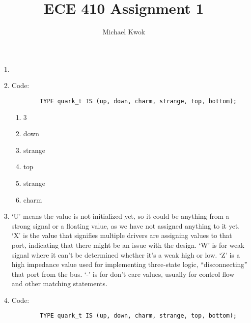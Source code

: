 \documentclass{article}
\title{ECE 410 Assignment 1}
\author{Michael Kwok}
\begin{document}
\maketitle
\begin{enumerate}
    \item

    \item
          Code:
          \begin{verbatim}
        TYPE quark_t IS (up, down, charm, strange, top, bottom);
      \end{verbatim}

          \begin{enumerate}
              \item 3
              \item down
              \item strange
              \item top
              \item strange
              \item charm
          \end{enumerate}

    \item `U' means the value is not initialized yet, so it could be anything from a strong signal or a floating value, as we have not assigned anything to it yet. `X' is the value that signifies multiple drivers are assigning values to that port, indicating that there might be an issue with the design. `W' is for weak signal where it can't be determined whether it's a weak high or low. `Z' is a high impedance value used for implementing three-state logic, ``disconnecting'' that port from the bus. `-' is for don't care values, usually for control flow and other matching statements.

    \item Code:
    \begin{verbatim}
        TYPE quark_t IS (up, down, charm, strange, top, bottom);
      \end{verbatim}

\end{enumerate}
\end{document}
